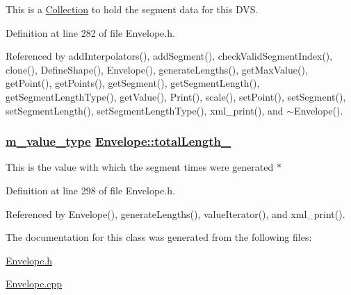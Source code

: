 This is a \hyperlink{classCollection}{Collection} to hold the segment data for this DVS. 

Definition at line 282 of file Envelope.h.

Referenced by add\-Interpolators(), add\-Segment(), check\-Valid\-Segment\-Index(), clone(), Define\-Shape(), Envelope(), generate\-Lengths(), get\-Max\-Value(), get\-Point(), get\-Points(), get\-Segment(), get\-Segment\-Length(), get\-Segment\-Length\-Type(), get\-Value(), Print(), scale(), set\-Point(), set\-Segment(), set\-Segment\-Length(), set\-Segment\-Length\-Type(), xml\_\-print(), and $\sim$Envelope().\hypertarget{classEnvelope_r3}{
\subsubsection[totalLength\_\-]{\setlength{\rightskip}{0pt plus 5cm}\hyperlink{Types_8h_a3}{m\_\-value\_\-type} \hyperlink{classEnvelope_r3}{Envelope::total\-Length\_\-}}}
\label{classEnvelope_r3}


This is the value with which the segment times were generated $\ast$ 

Definition at line 298 of file Envelope.h.

Referenced by Envelope(), generate\-Lengths(), value\-Iterator(), and xml\_\-print().

The documentation for this class was generated from the following files:\begin{CompactItemize}
\item 
\hyperlink{Envelope_8h}{Envelope.h}\item 
\hyperlink{Envelope_8cpp}{Envelope.cpp}\end{CompactItemize}

